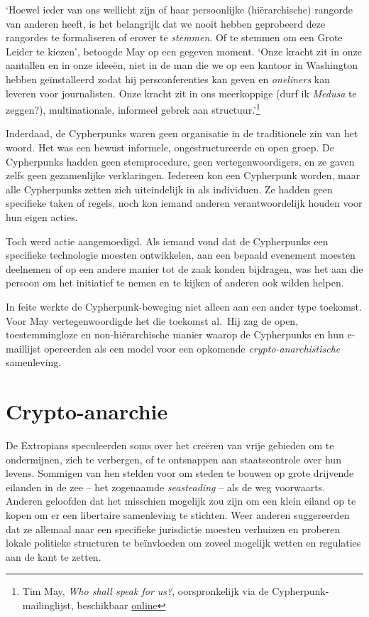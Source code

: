 \documentclass[
  a5paper,
  smalldemyvopaper,11pt,twoside,onecolumn,openright,extrafontsizes,
hidelinks]{memoir}
\begin{document}
`Hoewel ieder van ons wellicht zijn of haar persoonlijke (hiërarchische)
rangorde van anderen heeft, is het belangrijk dat we nooit hebben
geprobeerd deze rangordes te formaliseren of erover te \emph{stemmen}.
Of te stemmen om een Grote Leider te kiezen', betoogde May op een
gegeven moment. `Onze kracht zit in onze aantallen en in onze ideeën,
niet in de man die we op een kantoor in Washington hebben geïnstalleerd
zodat hij persconferenties kan geven en \emph{oneliners} kan leveren
voor journalisten. Onze kracht zit in ons meerkoppige (durf ik
\emph{Medusa} te zeggen?), multinationale, informeel gebrek aan
structuur.'\footnote{Tim May, \emph{Who shall speak for us?},
  oorspronkelijk via de Cypherpunk-mailinglijst, beschikbaar
  \href{https://cypherpunks.venona.com/date/1995/09/msg02189.html}{online}}

Inderdaad, de Cypherpunks waren geen organisatie in de traditionele zin
van het woord. Het was een bewust informele, ongestructureerde en open
groep. De Cypherpunks hadden geen stemprocedure, geen
vertegenwoordigers, en ze gaven zelfs geen gezamenlijke verklaringen.
Iedereen kon een Cypherpunk worden, maar alle Cypherpunks zetten zich
uiteindelijk in als individuen. Ze hadden geen specifieke taken of
regels, noch kon iemand anderen verantwoordelijk houden voor hun eigen
acties.

Toch werd actie aangemoedigd. Als iemand vond dat de Cypherpunks een
specifieke technologie moesten ontwikkelen, aan een bepaald evenement
moesten deelnemen of op een andere manier tot de zaak konden bijdragen,
was het aan die persoon om het initiatief te nemen en te kijken of
anderen ook wilden helpen.

In feite werkte de Cypherpunk-beweging niet alleen aan een ander type
toekomst. Voor May vertegenwoordigde het die toekomst al.~Hij zag de
open, toestemmingloze en non-hiërarchische manier waarop de Cypherpunks
en hun e-maillijst opereerden als een model voor een opkomende
\emph{crypto-anarchistische} samenleving.

\section{Crypto-anarchie}\label{crypto-anarchie}

De Extropians speculeerden soms over het creëren van vrije gebieden om
te ondermijnen, zich te verbergen, of te ontsnappen aan staatscontrole
over hun levens. Sommigen van hen stelden voor om steden te bouwen op
grote drijvende eilanden in de zee -- het zogenaamde \emph{seasteading}
-- als de weg voorwaarts. Anderen geloofden dat het misschien mogelijk
zou zijn om een klein eiland op te kopen om er een libertaire
samenleving te stichten. Weer anderen suggereerden dat ze allemaal naar
een specifieke jurisdictie moesten verhuizen en proberen lokale
politieke structuren te beïnvloeden om zoveel mogelijk wetten en
regulaties aan de kant te zetten.
\end{document}
